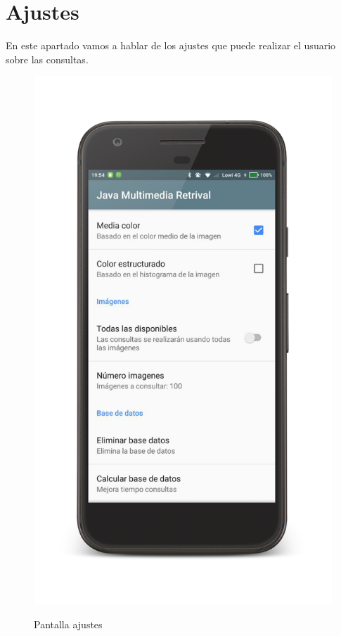 \section{Ajustes}

En este apartado vamos a hablar de los ajustes que puede realizar el usuario sobre las consultas.\\

\begin{figure}[H] %
\centering
\includegraphics[scale=0.15]{imagenes/ajustes.png}  %
\label{ajustes.png}
\caption{Pantalla ajustes}
\end{figure}

